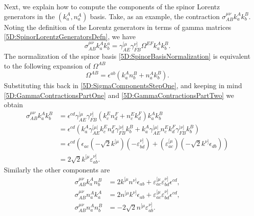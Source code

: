 Next, we explain how to compute the components of the spinor Lorentz generators
in the $(k^{A}_{a}, n^{A}_{a})$ basis. Take, as an example, the contraction
$\sigma^{\mu \nu}_{AB} k^{A}_{a} k^{B}_{b}$. Noting the definition of the Lorentz generators in terms of gamma
matrices \eqref{5D:SpinorLorentzGeneratorsDefn}, we have
%
\begin{equation} \label{5D:SigmaComponentsStepOne} 
        \sigma_{AB}^{\mu \nu} k^{A}_{a} k^{a}_{b} = \gamma^{[\mu}_{AE} \gamma^{\nu]}_{FB} \Omega^{EF}
        k^{A}_{a} k^{B}_{b}.
\end{equation}
%
The normalization of the spinor basis \eqref{5D:SpinorBasisNormalization} is equivalent to the following
expansion of $\Omega^{AB}$ 
%
\begin{equation} \label{5D:OmegaExpansion} 
    \Omega^{AB} = \epsilon^{ab}\left(k^{A}_{a} n^{B}_{b} + n^{A}_{a} k^{B}_{b}\right).
\end{equation}
%
Substituting this back in \eqref{5D:SigmaComponentsStepOne}, and keeping in mind \eqref{5D:GammaContractionsPartOne}
and \eqref{5D:GammaContractionsPartTwo} we obtain
\begin{equation} \label{5D:SigmaComponentsPartOne} 
    \begin{split}
        \sigma_{AB}^{\mu \nu} k^{A}_{a} k^{B}_{b} &= \epsilon^{cd} \gamma^{[\mu}_{AE} \gamma^{\nu]}_{FB}
        \left(k^{E}_{c} n^{F}_{d} + n^{E}_{c} k^{F}_{d}\right) k^{A}_{a} k^{B}_{b} \\
                                                  &= \epsilon^{cd} \left(k^{A}_{a} \gamma^{[\mu|}_{AE}
                                                  k^{E}_{c} n^{F}_{d} \gamma^{|\nu]}_{FB} k^{B}_{b} +
                                              k^{A}_{a} \gamma^{[\mu |}_{AE} n^{E}_{c} k^{F}_{d} \gamma^{|
                                          \nu]}_{FB} k^{B}_{b} \right) \\
                                                  &= \epsilon^{cd} \left( \epsilon_{ac} (- \sqrt{2}
                                                  k^{[\mu})(-\varepsilon^{\nu]}_{bd}) +
                                          (\varepsilon^{[\mu}_{ac}) ( - \sqrt{2}
                                  k^{\nu]}\epsilon_{db})\right) \\
                                                  &= 2\sqrt{2} k^{[\mu} \varepsilon^{\nu]}_{ab}.
   \end{split}
\end{equation}
%
Similarly the other components are
\begin{equation} \label{5D:SigmaComponentsPartTwo} 
    \begin{split}
        \sigma_{AB}^{\mu \nu} k^{A}_{a} n^{B}_{b} &= 2 k^{[\mu}n^{\nu]} \epsilon_{ab} +
        \varepsilon^{[\mu}_{ac} \varepsilon^{\nu]}_{bd} \epsilon^{cd}, \\
        \sigma_{AB}^{\mu \nu} n^{A}_{a} k^{A}_{a} &= 2 n^{[\mu} k^{\nu]} \epsilon_{ab} +
        \varepsilon^{[\mu}_{ac} \varepsilon^{\nu]}_{bd} \epsilon^{cd}, \\
        \sigma_{AB}^{\mu \nu} n^{A}_{a} n^{B}_{b} &= - 2\sqrt{2} n^{[\mu} \varepsilon^{\nu]}_{ab}.
    \end{split}
\end{equation}

